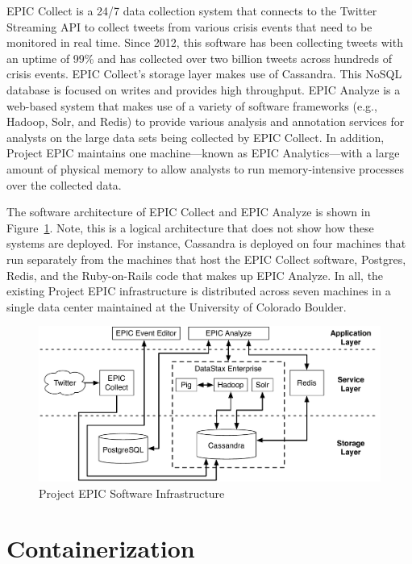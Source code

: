 EPIC Collect is a 24/7 data collection system that connects to the Twitter Streaming API to collect tweets from various crisis events that need to be monitored in real time. Since 2012, this software has been collecting tweets with an uptime of 99\% and has collected over two billion tweets across hundreds of crisis events. EPIC Collect’s storage layer makes use of Cassandra. This NoSQL database is focused on writes and provides high throughput. EPIC Analyze is a web-based system that makes use of a variety of software frameworks (e.g., Hadoop, Solr, and Redis) to provide various analysis and annotation services for analysts on the large data sets being collected by EPIC Collect. In addition, Project EPIC maintains one machine---known as EPIC Analytics---with a large amount of physical memory to allow analysts to run memory-intensive processes over the collected data.

The software architecture of EPIC Collect and EPIC Analyze is shown in Figure~\ref{fig:epicarch}. Note, this is a logical architecture that does not show how these systems are deployed. For instance, Cassandra is deployed on four machines that run separately from the machines that host the EPIC Collect software, Postgres, Redis, and the Ruby-on-Rails code that makes up EPIC Analyze. In all, the existing Project EPIC infrastructure is distributed across seven machines in a single data center maintained at the University of Colorado Boulder.

\begin{figure}
\centering
\includegraphics[width=\textwidth]{Figures/old_arch}
\decoRule
\caption[Project EPIC Software Infrastructure]{Project EPIC Software Infrastructure}
\label{fig:epicarch}
\end{figure}


\section{Containerization}

